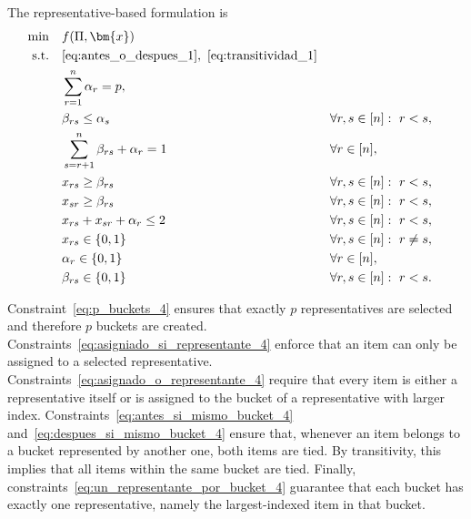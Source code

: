 \documentclass[pdflatex,basic,Numbered]{jnl}%
\theoremstyle{plain}
\theoremstyle{remark}
\theoremstyle{thmstyleone}%
\theoremstyle{thmstylethree}%
\begin{document}
The representative-based formulation is
\begin{subequations} \label{mod:p-bucket_2}
    \begin{align} 
    \min\quad & f(\Pi,\bm{x}) \\
    \text{s.t.}\quad 
        & \eqref{eq:antes_o_despues_1},\ \eqref{eq:transitividad_1} \\
        & \sum_{r=1}^n \alpha_r=p, \label{eq:p_buckets_4} \\
        & \beta_{rs}\le \alpha_s
        && \forall r,s\in[n]:\ r<s, \label{eq:asigniado_si_representante_4} \\
        & \sum_{s=r+1}^n \beta_{rs}+\alpha_r=1
        && \forall r\in[n], \label{eq:asignado_o_representante_4} \\
        & x_{rs}\ge \beta_{rs}
        && \forall r,s\in[n]:\ r<s, \label{eq:antes_si_mismo_bucket_4} \\
        & x_{sr}\ge \beta_{rs}
        && \forall r,s\in[n]:\ r<s, \label{eq:despues_si_mismo_bucket_4} \\
        & x_{rs}+x_{sr}+\alpha_r\le 2
        && \forall r,s\in[n]:\ r<s, \label{eq:un_representante_por_bucket_4} \\
        & x_{rs}\in\{0,1\}
        && \forall r,s\in[n]:\ r\neq s, \label{eq:naturaleza_x_4} \\
        & \alpha_r\in\{0,1\}
        && \forall r\in[n], \label{eq:naturaleza_alpha_4} \\
        & \beta_{rs}\in\{0,1\}
        && \forall r,s\in[n]:\ r<s. \label{eq:naturaleza_beta_4}
    \end{align}
\end{subequations}

Constraint~\eqref{eq:p_buckets_4} ensures that exactly \(p\) representatives are selected and therefore \(p\) buckets are created. Constraints~\eqref{eq:asigniado_si_representante_4} enforce that an item can only be assigned to a selected representative. Constraints~\eqref{eq:asignado_o_representante_4} require that every item is either a representative itself or is assigned to the bucket of a representative with larger index. Constraints~\eqref{eq:antes_si_mismo_bucket_4} and~\eqref{eq:despues_si_mismo_bucket_4} ensure that, whenever an item belongs to a bucket represented by another one, both items are tied. By transitivity, this implies that all items within the same bucket are tied. Finally, constraints~\eqref{eq:un_representante_por_bucket_4} guarantee that each bucket has exactly one representative, namely the largest-indexed item in that bucket.
\end{document}
